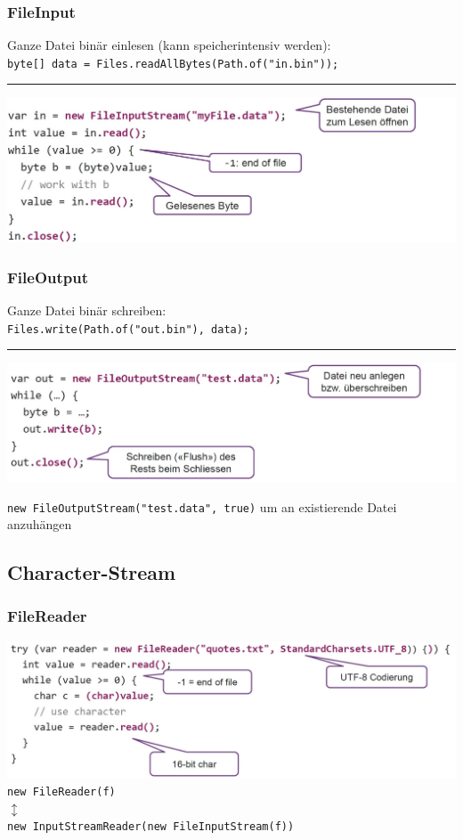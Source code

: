 \subsubsection{FileInput}
Ganze Datei binär einlesen (kann speicherintensiv werden):\\
\verb|byte[] data = Files.readAllBytes(Path.of("in.bin"));|
\hrule
\includegraphics[width=0.9\linewidth]{pictures/file-in.jpg}


\subsubsection{FileOutput}
Ganze Datei binär schreiben:\\
\verb|Files.write(Path.of("out.bin"), data);|
\hrule
\includegraphics[width=0.9\linewidth]{pictures/file-out.jpg}

\verb|new FileOutputStream("test.data", true)| um an existierende Datei anzuhängen

\subsection{Character-Stream}

\subsubsection{FileReader}
\includegraphics[width=0.9\linewidth]{pictures/filereader.jpg}\\
\verb|new FileReader(f)| \\
$\updownarrow$ \\
\verb|new InputStreamReader(new FileInputStream(f))|

